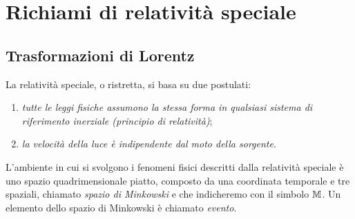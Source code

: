 \cleardoublepage
\chapter{Richiami di relatività speciale}
\label{cha:relativita-speciale}


\section{Trasformazioni di Lorentz}
\label{sec:trasformazioni-lorentz}

La relatività speciale, o ristretta, si basa su due postulati:
\begin{enumerate}
\item\emph{tutte le leggi fisiche assumono la stessa forma in qualsiasi sistema
    di riferimento inerziale (principio di
    relatività)};
\item \emph{la velocità della luce è indipendente dal moto della sorgente}.
\end{enumerate}

L'ambiente in cui si svolgono i fenomeni fisici descritti dalla relatività
speciale è uno spazio quadrimensionale piatto, composto da una coordinata
temporale e tre spaziali, chiamato 
\emph{spazio di Minkowski} e che indicheremo con il simbolo $\mathbb{M}$.  Un elemento
dello spazio di Minkowski è chiamato \emph{evento}.

